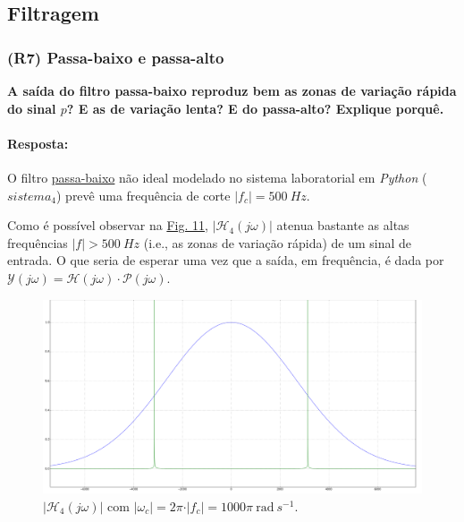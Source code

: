 
\clearpage
\subsection{\bf{Filtragem}}
\label{subsec:filtragem}
\subsubsection{(R7) Passa-baixo e passa-alto}
\label{subsubsec:R7}
\textbf{A saída do filtro passa-baixo reproduz bem as zonas de variação rápida do sinal \(p\)? E as de variação lenta? E do passa-alto? Explique porquê.}
\paragraph{Resposta:} %
O filtro \underline{passa-baixo} não ideal modelado no sistema laboratorial em \textit{Python} (\(sistema_4\)) prevê uma frequência de corte \(\vert f_{c}\vert = 500\ Hz\). 

Como é possível observar na \hyperref[fig:ganho_passa-baixo]{Fig. 11}, \(\vert \mathcal{H}_4(j\omega)\vert\) atenua bastante as altas frequências \(\vert f\vert > 500\ Hz\) (i.e., as zonas de variação rápida) de um sinal de entrada. O que seria de esperar uma vez que a saída, em frequência, é dada por \(\mathcal{Y}(j\omega) = \mathcal{H}(j\omega) \cdot \mathcal{P}(j\omega)\).

\begin{figure}[H]
    \centering
    \includegraphics[width = 0.5\linewidth]{prints/ganho_passa-baixo.png}   
    \caption{\(\vert \mathcal{H}_4(j\omega)\vert\) com \(\vert \omega_{c}\vert = 2\pi \cdot \vert f_{c}\vert = 1000\pi\ \text{rad}\ s^{-1}\).}
    \label{fig:ganho_passa-baixo}
\end{figure}


